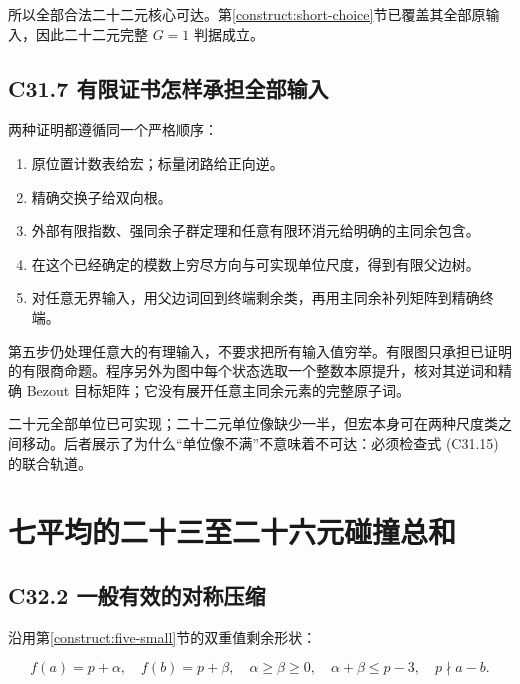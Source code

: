 \documentclass[11pt,a4paper]{article}
\newcommand{\tightlist}{\setlength{\itemsep}{0pt}\setlength{\parskip}{0pt}}
\theoremstyle{definition}
\numberwithin{equation}{section}
\begin{document}
{所以全部合法二十二元核心可达。}第\ref{construct:short-choice}节{已覆盖其全部原输入，因此二十二元完整} {\ensuremath{G=1}} {判据成立。}

\subsection*{\texorpdfstring{{C31.7} {有限证书怎样承担全部输入}}{C31.7 有限证书怎样承担全部输入}}\label{C31-h207}

{两种证明都遵循同一个严格顺序：}

\begin{enumerate}
\def\labelenumi{\arabic{enumi}.}
\tightlist
\item
  {原位置计数表给宏；标量闭路给正向逆。}
\item
  {精确交换子给双向根。}
\item
  {外部有限指数、强同余子群定理和任意有限环消元给明确的主同余包含。}
\item
  {在这个已经确定的模数上穷尽方向与可实现单位尺度，得到有限父边树。}
\item
  {对任意无界输入，用父边词回到终端剩余类，再用主同余补列矩阵到精确终端。}
\end{enumerate}

{第五步仍处理任意大的有理输入，不要求把所有输入值穷举。有限图只承担已证明的有限商命题。程序另外为图中每个状态选取一个整数本原提升，核对其逆词和精确} {Bezout} {目标矩阵；它没有展开任意主同余元素的完整原子词。}

{二十元全部单位已可实现；二十二元单位像缺少一半，但宏本身可在两种尺度类之间移动。后者展示了为什么``单位像不满''不意味着不可达：必须检查式} {(C31.15)} {的联合轨道。}


\section{七平均的二十三至二十六元碰撞总和}\label{construct:seven-collisions}
\subsection*{\texorpdfstring{{C32.2} {一般有效的对称压缩}}{C32.2 一般有效的对称压缩}}\label{C32-h208}

{沿用}第\ref{construct:five-small}节{的双重值剩余形状：}

\[
f(a)=p+\alpha,\quad f(b)=p+\beta,
\quad\alpha\ge\beta\ge0,\quad\alpha+\beta\le p-3,
\quad p\nmid a-b.
\]
\end{document}
